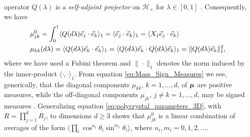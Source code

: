 \documentclass[11pt]{amsart}
\newcommand\bmu{\mbox{\boldmath${\mu}$}}
\begin{document}
operator $Q(\lambda)$ is a \emph{self-adjoint projector} on $\mathscr{H}_\times$
for $\lambda\in[0,1]$ \cite{Reed-1980,Stone:64}. Consequently,  we have 
% 
\begin{align}\label{eq:Mass_Sign_Measures}
   &\mu_{jk}^0%
         =\int_0^1\langle Q(d\lambda)\vec{e}_j\cdot\vec{e}_k\rangle_1
        =\langle\vec{e}_j\cdot\vec{e}_k\rangle_1
        =\langle X_1\vec{e}_j\cdot\vec{e}_k\rangle\\
   &\mu_{kk}(d\lambda)=\langle Q(d\lambda)\vec{e}_k\cdot\vec{e}_k\rangle_1
       =\langle Q(d\lambda)\vec{e}_k\cdot Q(d\lambda)\vec{e}_k\rangle_1
       =\|Q(d\lambda)\vec{e}_k\|_1^2,\notag
\end{align}
%
where we have used a Fubini theorem \cite{Folland:99}
and $\|\cdot\|_1$ denotes the norm induced by the inner-product
$\langle\cdot,\cdot\rangle_1$. From equation \eqref{eq:Mass_Sign_Measures} we see,
generically, that the diagonal components $\mu_{kk}$, $k=1,\ldots,d$, of
$\bmu$ are positive measures, while the off-diagonal components
$\mu_{jk}$, $j\neq k=1,\ldots,d$, may be signed measures \cite{Folland:99,Rudin:87}.
Generalizing equation \eqref{eq:polycrystal_parameters_3D}, with
$R=\prod_{j=1}^dR_j$, to dimensions $d\geq3$ shows that $\mu_{jk}^0$ is a
linear combination of averages of the 
form $\langle\prod_i\cos^{n_i}\theta_i\sin^{m_i}\theta_i\rangle$, where $n_i,m_i=0,1,2,\ldots$.



\end{document}
